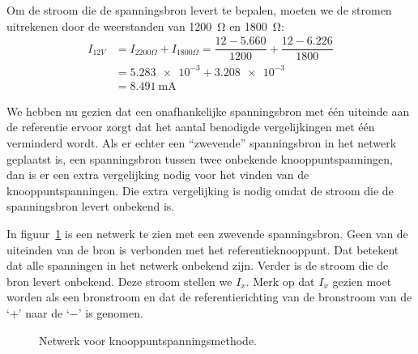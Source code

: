 \begin{example}
Om de stroom die de spanningsbron levert te bepalen, moeten we de stromen uitrekenen door de weerstanden van \SI{1200}{\ohm} en \SI{1800}{\ohm}:
\begin{equation}
\begin{split}
I_{12V} &= I_{2200\Omega} + I_{1800\Omega} = \dfrac{12-\num{5.660}}{1200} + \dfrac{12-\num{6.226}}{1800} \\
        &= \num{5.283e-3}+\num{3,208e-3} \\
        &= \SI{8,491}{\mA}
\end{split}
\end{equation}
\end{example}

We hebben nu gezien dat een onafhankelijke spanningsbron met één uiteinde aan de referentie ervoor zorgt dat het aantal benodigde vergelijkingen met één verminderd wordt. Als er echter een ``zwevende'' spanningsbron in het netwerk geplaatst is, een spanningsbron tussen twee onbekende knooppuntspanningen, dan is er een extra vergelijking nodig voor het vinden van de knooppuntspanningen. Die extra vergelijking is nodig omdat de stroom die de spanningsbron levert onbekend is.

In figuur~\ref{fig:gelnetwerkvoornodalanalysis6} is een netwerk te zien met een zwevende spanningsbron. Geen van de uiteinden van de bron is verbonden met het referentieknooppunt. Dat betekent dat alle spanningen in het netwerk onbekend zijn. Verder is de stroom die de bron levert onbekend. Deze stroom stellen we $I_x$. Merk op dat $I_x$ gezien moet worden als een bronstroom en dat de referentierichting van de bronstroom van de `+' naar de `$-$' is genomen.

\begin{figure}[!ht]
\centering
{}
\caption{Netwerk voor knooppuntspanningsmethode.}
\label{fig:gelnetwerkvoornodalanalysis6}
\end{figure}

